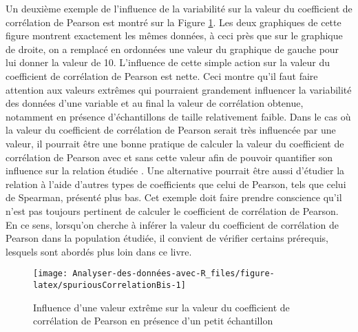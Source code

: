 \documentclass[
  french,
]{book}
\begin{document}
Un deuxième exemple de l'influence de la variabilité sur la valeur du coefficient de corrélation de Pearson est montré sur la Figure \ref{fig:spuriousCorrelationBis}. Les deux graphiques de cette figure montrent exactement les mêmes données, à ceci près que sur le graphique de droite, on a remplacé en ordonnées une valeur du graphique de gauche pour lui donner la valeur de 10. L'influence de cette simple action sur la valeur du coefficient de corrélation de Pearson est nette. Ceci montre qu'il faut faire attention aux valeurs extrêmes qui pourraient grandement influencer la variabilité des données d'une variable et au final la valeur de corrélation obtenue, notamment en présence d'échantillons de taille relativement faible. Dans le cas où la valeur du coefficient de corrélation de Pearson serait très influencée par une valeur, il pourrait être une bonne pratique de calculer la valeur du coefficient de corrélation de Pearson avec et sans cette valeur afin de pouvoir quantifier son influence sur la relation étudiée \autocite{halperinSpuriousCorrelationsCauses1986}. Une alternative pourrait être aussi d'étudier la relation à l'aide d'autres types de coefficients que celui de Pearson, tels que celui de Spearman, présenté plus bas. Cet exemple doit faire prendre conscience qu'il n'est pas toujours pertinent de calculer le coefficient de corrélation de Pearson. En ce sens, lorsqu'on cherche à inférer la valeur du coefficient de corrélation de Pearson dans la population étudiée, il convient de vérifier certains prérequis, lesquels sont abordés plus loin dans ce livre.

\begin{figure}

{\centering \texttt{[image: Analyser-des-données-avec-R\_files/figure-latex/spuriousCorrelationBis-1]} 

}

\caption{Influence d'une valeur extrême sur la valeur du coefficient de corrélation de Pearson en présence d'un petit échantillon}\label{fig:spuriousCorrelationBis}
\end{figure}
\end{document}
